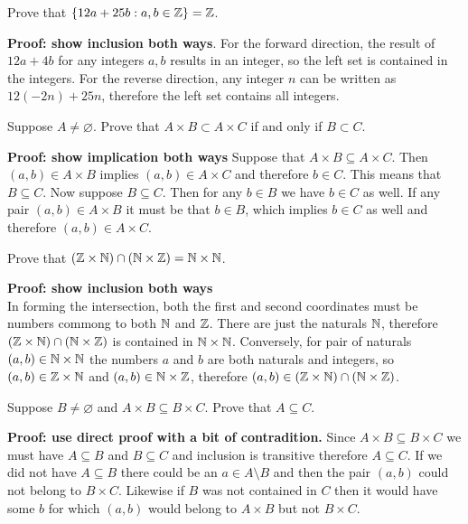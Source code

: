 \documentclass{article}
\begin{document}
\begin{problem}
Prove that $\{12a + 25b : a, b \in \mathbb{Z}\} = \mathbb{Z}$.
\end{problem}
\textbf{Proof: show inclusion both ways}. For the forward direction, the result of $12a + 4b$ for any integers $a, b$ results in an integer, so the left set is contained in the integers. For the reverse direction, any integer $n$ can be written as $12(-2n) + 25n$, therefore the left set contains all integers.

\begin{problem}
Suppose $A \neq \varnothing$. Prove that $A \times B \subset A \times C$ if and only if $B \subset C$.
\end{problem}

\textbf{Proof: show implication both ways}
Suppose that $A \times B \subseteq A \times C$. Then $(a, b) \in A \times B$ implies $(a, b) \in A \times C$ and therefore $b \in C$. This means that $B \subseteq C$. Now suppose $B \subseteq C$. Then for any $b \in B$ we have $b \in C$ as well. If any pair $(a, b) \in A \times B$ it must be that $b \in B$, which implies $b \in C$ as well and therefore $(a, b) \in A \times C$.

\begin{problem}
Prove that $(\mathbb{Z} \times \mathbb{N}) \cap (\mathbb{N} \times \mathbb{Z}) = \mathbb{N} \times \mathbb{N}$.
\end{problem}
\textbf{Proof: show inclusion both ways}
\\
In forming the intersection, both the first and second coordinates must be numbers commong to both $\mathbb{N}$ and $\mathbb{Z}$. There are just the naturals $\mathbb{N}$, therefore $(\mathbb{Z} \times \mathbb{N}) \cap (\mathbb{N} \times \mathbb{Z})$ is contained in $\mathbb{N} \times \mathbb{N}$. Conversely, for pair of naturals $(a, b) \in \mathbb{N} \times \mathbb{N}$ the numbers $a$ and $b$ are both naturals and integers, so $(a, b) \in \mathbb{Z} \times \mathbb{N}$ and $(a, b) \in \mathbb{N} \times \mathbb{Z}$, therefore $(a, b) \in (\mathbb{Z} \times \mathbb{N}) \cap (\mathbb{N} \times \mathbb{Z})$.

\begin{problem}
Suppose $B \neq \varnothing$ and $A \times B \subseteq B \times C$. Prove that $A \subseteq C$.
\end{problem}

\textbf{Proof: use direct proof with a bit of contradition.}
Since $A \times B \subseteq B \times C$ we must have $A \subseteq B$ and $B \subseteq C$ and inclusion is transitive therefore $A \subseteq C$. If we did not have $A \subseteq B$ there could be an $a \in A\setminus B$ and then the pair $(a, b)$ could not belong to $B \times C$. Likewise if $B$ was not contained in $C$ then it would have some $b$ for which $(a, b)$ would belong to $A \times B$ but not $B \times C$.
\end{document}
